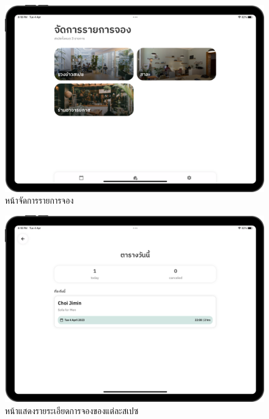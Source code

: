 \begin{figure}[ht]
    \begin{center}
    \includegraphics[width=5.5in]{./image/Flowider_booking_mgmt.png}
    \end{center}
    \caption[Flowider booking management]{หน้าจัดการรายการจอง}
    \label{fig:Flowider_booking_mgmt}
\end{figure}
\begin{figure}[ht]
    \begin{center}
    \includegraphics[width=5.5in]{./image/Flowider_schedule.png}
    \end{center}
    \caption[Flowide schedule]{หน้าแสดงรายระเอียดการจองของแต่ละสเปซ}
    \label{fig:Flowider_schedule}
\end{figure}

